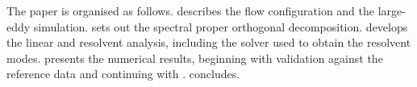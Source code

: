
The paper is organised as follows.
 describes the flow configuration and the large-eddy
simulation.
 sets out the spectral proper orthogonal decomposition.
 develops the linear and resolvent analysis, including the
solver used to obtain the resolvent modes.
 presents the numerical results, beginning with validation
against the reference data and continuing with .
 concludes.
